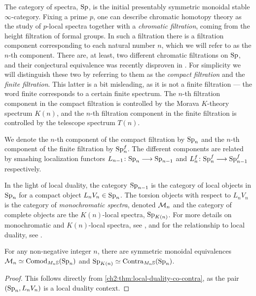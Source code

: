 The category of spectra, $\mathrm{Sp}$, is the initial presentably symmetric monoidal stable $\infty$-category. Fixing a prime $p$, one can describe chromatic homotopy theory as the study of $p$-local spectra together with a \emph{chromatic filtration}, coming from the height filtration of formal groups. In such a filtration there is a filtration component corresponding to each natural number $n$, which we will refer to as the $n$-th component. There are, at least, two different chromatic filtrations on $\mathrm{Sp}$, and their conjectural equivalence was recently disproven in \cite{burklund-hahn-levy-schlank_23}. For simplicity we will distinguish these two by referring to them as the \emph{compact filtration} and the \emph{finite filtration}. This latter is a bit misleading, as it is not a finite filtration --- the word finite corresponds to a certain finite spectrum. The $n$-th filtration component in the compact filtration is controlled by the Morava $K$-theory spectrum $K(n)$, and the $n$-th filtration component in the finite filtration is controlled by the telescope spectrum $T(n)$. 

We denote the $n$-th component of the compact filtration by $\mathrm{Sp}_n$ and the $n$-th component of the finite filtration by $\mathrm{Sp}_n^f$. The different components are related by smashing localization functors $L_{n-1}\colon\mathrm{Sp}_n \longrightarrow \mathrm{Sp}_{n-1}$ and $L_n^f\colon \mathrm{Sp}_n^f \longrightarrow \mathrm{Sp}_{n-1}^f$ respectively. 

In the light of local duality, the category $\mathrm{Sp}_{n-1}$ is the category of local objects in $\mathrm{Sp}_n$ for a compact object $L_nV_n \in \mathrm{Sp}_n$. The torsion objects with respect to $L_nV_n$ is the category of \emph{monochromatic spectra}, denoted $\mathcal{M}_{n}$ and the category of complete objects are the $K(n)$-local spectra, $\mathrm{Sp}_{K(n)}$. For more details on monochromatic and $K(n)$-local spectra, see \cite{hovey-strickland_99}, and for the relationship to local duality, see \cite[Section 6.2]{barthel-heard-valenzuela_2018}. 

\begin{proposition}
    For any non-negative integer $n$, there are symmetric monoidal equivalences $\mathcal{M}_{n} \simeq \mathrm{Comod}_{M_n\mathbb{S}}(\mathrm{Sp}_n)$ and $\mathrm{Sp}_{K(n)}\simeq \mathrm{Contra}_{M_n\mathbb{S}}(\mathrm{Sp}_n)$.
\end{proposition}
\begin{proof}
    This follows directly from \cref{ch2:thm:local-duality-co-contra}, as the pair $(\mathrm{Sp}_n, L_nV_n)$ is a local duality context. 
\end{proof}

